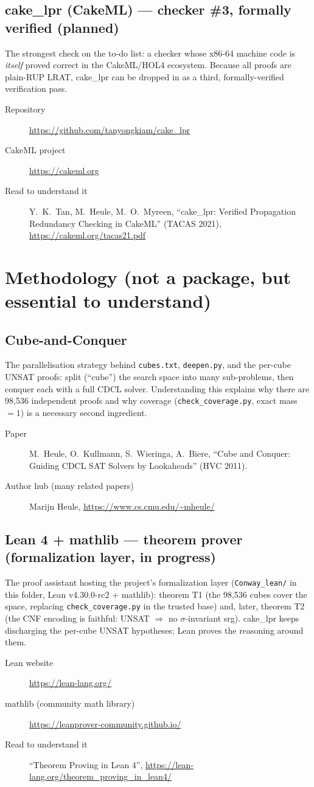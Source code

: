 \documentclass[11pt]{article}
\newcommand{\tool}[1]{\subsection{#1}}
\begin{document}
\tool{cake\_lpr (CakeML) --- checker \#3, formally verified (planned)}
The strongest check on the to-do list: a checker whose x86-64 machine code is
\emph{itself} proved correct in the CakeML/HOL4 ecosystem. Because all proofs
are plain-RUP LRAT, cake\_lpr can be dropped in as a third, formally-verified
verification pass.
\begin{description}
  \item[Repository] \url{https://github.com/tanyongkiam/cake_lpr}
  \item[CakeML project] \url{https://cakeml.org}
  \item[Read to understand it] Y.\ K.\ Tan, M.\ Heule, M.\ O.\ Myreen,
        ``cake\_lpr: Verified Propagation Redundancy Checking in CakeML''
        (TACAS 2021), \url{https://cakeml.org/tacas21.pdf}
\end{description}

\section{Methodology (not a package, but essential to understand)}

\tool{Cube-and-Conquer}
The parallelisation strategy behind \texttt{cubes.txt}, \texttt{deepen.py}, and
the per-cube UNSAT proofs: split (``cube'') the search space into many
sub-problems, then conquer each with a full CDCL solver. Understanding this
explains why there are 98{,}536 independent proofs and why coverage
(\texttt{check\_coverage.py}, exact mass $=1$) is a necessary second ingredient.
\begin{description}
  \item[Paper] M.\ Heule, O.\ Kullmann, S.\ Wieringa, A.\ Biere, ``Cube and
        Conquer: Guiding CDCL SAT Solvers by Lookaheads'' (HVC 2011).
  \item[Author hub (many related papers)] Marijn Heule, \url{https://www.cs.cmu.edu/~mheule/}
\end{description}

\tool{Lean 4 + mathlib --- theorem prover (formalization layer, in progress)}
The proof assistant hosting the project's formalization layer
(\texttt{Conway\_lean/} in this folder, Lean v4.30.0-rc2 + mathlib):
theorem T1 (the 98{,}536 cubes cover the space, replacing
\texttt{check\_coverage.py} in the trusted base) and, later, theorem T2 (the CNF
encoding is faithful: UNSAT $\Rightarrow$ no $\sigma$-invariant srg). cake\_lpr
keeps discharging the per-cube UNSAT hypotheses; Lean proves the reasoning
around them.
\begin{description}
  \item[Lean website] \url{https://lean-lang.org/}
  \item[mathlib (community math library)] \url{https://leanprover-community.github.io/}
  \item[Read to understand it] ``Theorem Proving in Lean 4'',
        \url{https://lean-lang.org/theorem_proving_in_lean4/}
\end{description}
\end{document}
